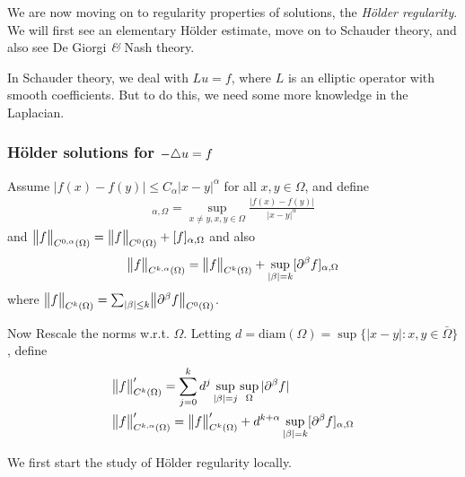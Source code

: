 \documentclass[12pt,a4paper]{article}
\begin{document}
We are now moving on to regularity properties of solutions, the \emph{H\"older regularity}. We will first see an elementary H\"older estimate, move on to Schauder theory, and also see De Giorgi \emph{\&} Nash theory.
\s

In Schauder theory, we deal with $Lu=f$, where $L$ is an elliptic operator with smooth coefficients. But to do this, we need some more knowledge in the Laplacian.
\s

\subsubsection*{H\"{o}lder solutions for $-\triangle u =f$}

 Assume $|f(x)-f(y)| \leq C_{\alpha} |x-y|^{\alpha}$ for all $x,y\in \Omega$, and define
\begin{align*}
[f]_{\alpha, \Omega} = \sup_{x\neq y, x,y\in \Omega} \frac{|f(x)-f(y)|}{|x-y|^{\alpha}}
\end{align*}
and $\bigl\lVert f\bigr\rVert_{C^{0,\alpha}(\Omega)} = \bigl\lVert f\bigr\rVert_{C^0(\Omega)} + [f]_{\alpha, \Omega}$ and also
\begin{align*}
\bigl\lVert f\bigr\rVert_{C^{k,\alpha}(\Omega)} = \bigl\lVert f\bigr\rVert_{C^k(\Omega)} + \sup_{|\beta|=k}[\partial^{\beta} f]_{\alpha, \Omega}
\end{align*}
where $\bigl\lVert f\bigr\rVert_{C^k(\Omega)} = \sum_{|\beta|\leq k} \bigl\lVert\partial^{\beta} f\bigr\rVert_{C^0(\Omega)}$.
\s

Now Rescale the norms w.r.t. $\Omega$. Letting $d= \text{diam}(\Omega) = \sup \{|x-y| : x,y\in \bar{\Omega}\}$, define
\begin{align*}
&\bigl\lVert f\bigr\rVert_{C^k(\Omega)}' = \sum_{j=0}^k d^j \sup_{|\beta|=j} \sup_{\Omega} |\partial^{\beta}f| \\
&\bigl\lVert f\bigr\rVert_{C^{k, \alpha}(\Omega)}' = \bigl\lVert f\bigr\rVert_{C^k(\Omega)}' + d^{k+\alpha}\sup_{|\beta|=k}[\partial^{\beta}f]_{\alpha, \Omega}
\end{align*}
\s

We first start the study of H\"{o}lder regularity locally.
\s
\end{document}
